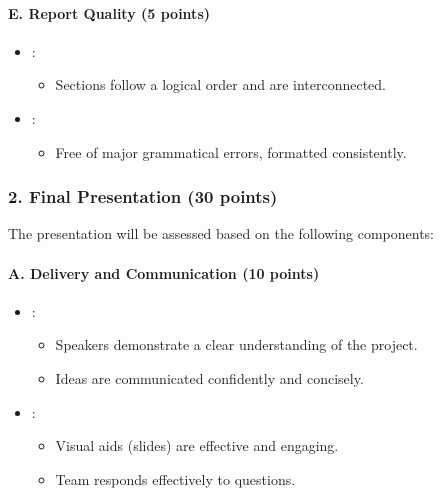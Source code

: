 \documentclass[letterpaper,10pt,english]{jupyterBook}
\begin{document}
\paragraph{E. Report Quality (5 points)}
\label{\detokenize{ProjectInstructions:e-report-quality-5-points}}\begin{itemize}
\item {} 
\sphinxAtStartPar
{}:
\begin{itemize}
\item {} 
\sphinxAtStartPar
Sections follow a logical order and are interconnected.

\end{itemize}

\item {} 
\sphinxAtStartPar
{}:
\begin{itemize}
\item {} 
\sphinxAtStartPar
Free of major grammatical errors, formatted consistently.

\end{itemize}

\end{itemize}


\subsubsection{2. Final Presentation (30 points)}
\label{\detokenize{ProjectInstructions:final-presentation-30-points}}
\sphinxAtStartPar
The presentation will be assessed based on the following components:


\paragraph{A. Delivery and Communication (10 points)}
\label{\detokenize{ProjectInstructions:a-delivery-and-communication-10-points}}\begin{itemize}
\item {} 
\sphinxAtStartPar
{}:
\begin{itemize}
\item {} 
\sphinxAtStartPar
Speakers demonstrate a clear understanding of the project.

\item {} 
\sphinxAtStartPar
Ideas are communicated confidently and concisely.

\end{itemize}

\item {} 
\sphinxAtStartPar
{}:
\begin{itemize}
\item {} 
\sphinxAtStartPar
Visual aids (slides) are effective and engaging.

\item {} 
\sphinxAtStartPar
Team responds effectively to questions.

\end{itemize}

\end{itemize}
\end{document}
